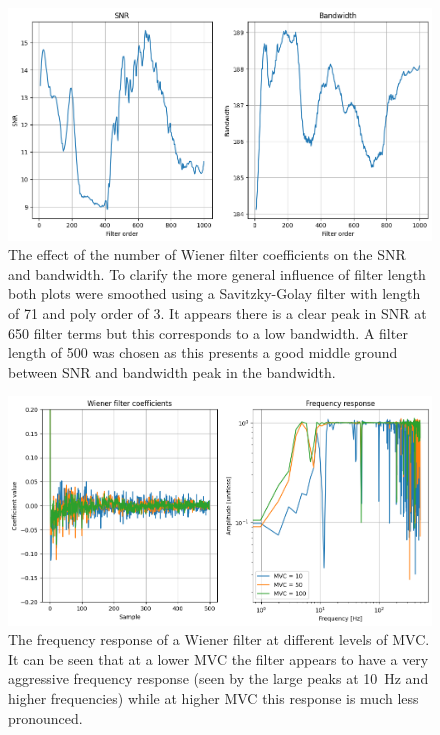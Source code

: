 \begin{figure}[h!t]
	\begin{center}
		\includegraphics[width=1.0\columnwidth]{images/wiener_filter_length.png}
	\end{center}
	\caption{The effect of the number of Wiener filter coefficients on the SNR and bandwidth. To clarify the more general influence of filter length both plots were smoothed using a Savitzky-Golay filter with length of 71 and poly order of 3. It appears there is a clear peak in SNR at 650 filter terms but this corresponds to a low bandwidth. A filter length of 500 was chosen as this presents a good middle ground between SNR and bandwidth peak in the bandwidth. }
	\label{fig:wiener_filter_length}
\end{figure}

\begin{figure}[h!t]
	\begin{center}
		\includegraphics[width=1.0\columnwidth]{images/wiener_filter_response_mvc.png}
	\end{center}
	\caption{The frequency response of a Wiener filter at different levels of MVC. It can be seen that at a lower MVC the filter appears to have a very aggressive frequency response (seen by the large peaks at \SI{10}{\hertz} and higher frequencies) while at higher MVC this response is much less pronounced.}
	\label{fig:wiener_filter_response_mvc}
\end{figure}


